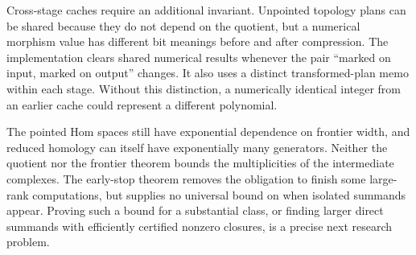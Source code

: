 Cross-stage caches require an additional invariant.  Unpointed topology
plans can be shared because they do not depend on the quotient, but a
numerical morphism value has different bit meanings before and after
compression.  The implementation clears shared numerical results whenever
the pair ``marked on input, marked on output'' changes.  It also uses a
distinct transformed-plan memo within each stage.  Without this distinction,
a numerically identical integer from an earlier cache could represent a
different polynomial.

The pointed Hom spaces still have exponential dependence on frontier width,
and reduced homology can itself have exponentially many generators.  Neither
the quotient nor the frontier theorem bounds the multiplicities of the
intermediate complexes.  The early-stop theorem removes the obligation to
finish some large-rank computations, but supplies no universal bound on when
isolated summands appear.  Proving such a bound for a substantial class,
or finding larger direct summands with efficiently certified nonzero
closures, is a precise next research problem.

